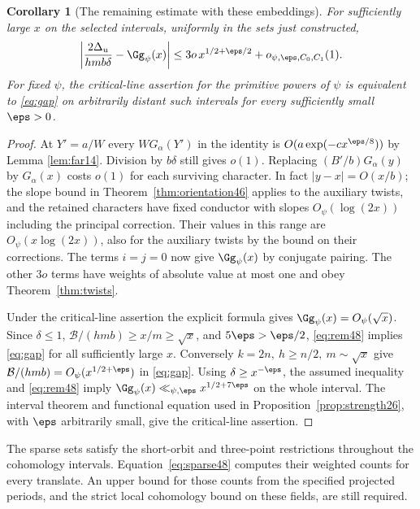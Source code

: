 \documentclass[a4paper,11pt]{article}
\newtheorem{corollary}[proposition]{Corollary}
\theoremstyle{definition}
\theoremstyle{remark}
\numberwithin{equation}{section}
\begin{document}
\begin{corollary}[The remaining estimate with these embeddings]\label{cor:window48}
For sufficiently large \(x\) on the selected intervals, uniformly in
the sets just constructed,
\[
 \left|\frac{2\Delta_u}{hm b\delta}-\Gg_\psi(x)\right|
       \le 3o\,x^{1/2+\eps/2}+o_{\psi,\eps,C_0,C_1}(1).
                                                                    \label{eq:rem48}
\]
For fixed \(\psi\), the critical-line assertion for the primitive
powers of \(\psi\) is equivalent to \eqref{eq:gap} on arbitrarily
distant such intervals for every sufficiently small \(\eps>0\).
\end{corollary}
\begin{proof}
At \(Y'=a/W\) every \(WG_{\alpha}(Y')\) in the identity is
\(O(a\exp(-c x^{\eps/8}))\) by Lemma \ref{lem:far14}. Division by
\(b\delta\) still gives \(o(1)\). Replacing
\((B'/b)G_\alpha(y)\) by \(G_\alpha(x)\) costs \(o(1)\) for each
surviving character. In fact \(|y-x|=O(x/b)\); the slope bound in
Theorem~\ref{thm:orientation46} applies to the auxiliary twists, and
the retained characters have fixed conductor with slopes
\(O_\psi(\log(2x))\) including the principal correction. Their values
in this range are \(O_\psi(x\log(2x))\), also for the auxiliary twists
by the bound on their corrections. The terms \(i=j=0\) now give
\(\Gg_\psi(x)\) by conjugate pairing. The other \(3o\) terms have
weights of absolute value at most one and obey Theorem~\ref{thm:twists}.

Under the critical-line assertion the explicit formula gives
\(\Gg_\psi(x)=O_\psi(\sqrt x)\). Since \(\delta\le1\),
\(\mathcal B/(hmb)\ge x/m\ge\sqrt x\), and \(5\eps>\eps/2\),
\eqref{eq:rem48} implies \eqref{eq:gap} for all sufficiently large \(x\).
Conversely \(k=2n,\ h\ge n/2,\ m\sim\sqrt{x}\) give
\(\mathcal B/(hmb)=O_\psi(x^{1/2+\eps})\) in \eqref{eq:gap}.
Using \(\delta\ge x^{-\eps}\), the assumed inequality and
\eqref{eq:rem48} imply \(\Gg_\psi(x)\ll_{\psi,\eps}x^{1/2+7\eps}\)
on the whole interval. The interval theorem and functional equation
used in Proposition~\ref{prop:strength26}, with \(\eps\) arbitrarily
small, give the critical-line assertion.
\end{proof}

The sparse sets satisfy the short-orbit and three-point restrictions
throughout the cohomology intervals. Equation~\eqref{eq:sparse48}
computes their weighted counts for every translate. An upper bound
for those counts from the specified projected periods, and the strict
local cohomology bound on these fields, are still required.
\end{document}
